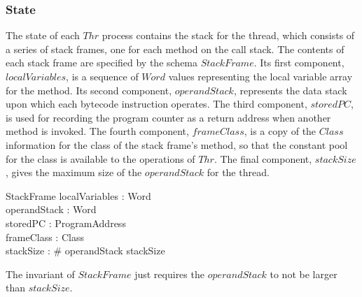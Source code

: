 \subsubsection*{State}

The state of each $Thr$ process contains the stack for the thread,
which consists of a series of stack frames, one for each method on the
call stack.
The contents of each stack frame are specified by the schema
$StackFrame$.
Its first component, $localVariables$, is a sequence of $Word$ values
representing the local variable array for the method.
Its second component, $operandStack$, represents the data stack upon
which each bytecode instruction operates.
The third component, $storedPC$, is used for recording the program
counter as a return address when another method is invoked.
The fourth component, $frameClass$, is a copy of the $Class$
information for the class of the stack frame's method, so that the
constant pool for the class is available to the operations of $Thr$.
The final component, $stackSize$, gives the maximum size of the
$operandStack$ for the thread.
\begin{schema}{StackFrame}
  localVariables : \seq Word \\
  operandStack : \seq Word \\
  storedPC : ProgramAddress \\
  frameClass : Class \\
  stackSize : \nat
\where
  \# operandStack \leq stackSize
\end{schema}
The invariant of $StackFrame$ just requires the $operandStack$ to not
be larger than $stackSize$.

